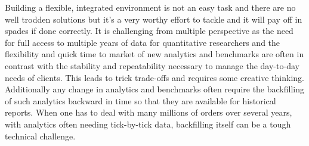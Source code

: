 Building a flexible, integrated environment is not an easy task and there are no well trodden solutions but it's a very worthy effort to tackle and it will pay off in spades if done correctly. It is challenging from multiple perspective as the need for full access to multiple years of data  for quantitative researchers and the flexibility and quick time to market of new analytics and benchmarks are often in contrast with the stability and repeatability necessary to manage the day-to-day needs of clients. This leads to trick trade-offs and requires some creative thinking. \\ Additionally any change in analytics and benchmarks often require the backfilling of such analytics backward in time so that they are available for historical reports. When one has to deal with many millions of orders over several years, with analytics often needing tick-by-tick data, backfilling itself can be a tough technical challenge.

